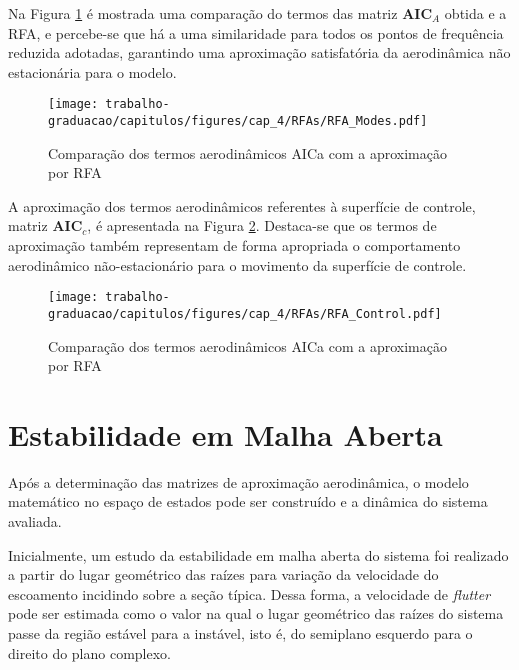 Na Figura \ref{fig:RFAsModes} é mostrada uma comparação do termos das matriz $\boldsymbol{AIC}_{A}$ obtida e a \gls{RFA}, e percebe-se que há a uma similaridade para todos os pontos de frequência reduzida adotadas, garantindo uma aproximação satisfatória da aerodinâmica não estacionária para o modelo.

\begin{figure}[!h]
    \centering
    \caption{Comparação dos termos aerodinâmicos \gls{AICa} com a aproximação por \gls{RFA}}
    \noindent\texttt{[image: trabalho-graduacao/capitulos/figures/cap\_4/RFAs/RFA\_Modes.pdf]}
    \label{fig:RFAsModes}
\end{figure}

\newpage

A aproximação dos termos aerodinâmicos referentes à superfície de controle, matriz $\boldsymbol{AIC}_{c}$, é apresentada na Figura \ref{fig:RFAsControl}. Destaca-se que os termos de aproximação também representam de forma apropriada o comportamento aerodinâmico não-estacionário para o movimento da superfície de controle.

\begin{figure}[ht!]
    \centering
    \caption{Comparação dos termos aerodinâmicos \gls{AICa} com a aproximação por \gls{RFA}}
    \noindent\texttt{[image: trabalho-graduacao/capitulos/figures/cap\_4/RFAs/RFA\_Control.pdf]}
    \label{fig:RFAsControl}
\end{figure}




\section{Estabilidade em Malha Aberta}\label{sec:malha-aberta}

Após a determinação das matrizes de aproximação aerodinâmica, o modelo matemático no espaço de estados pode ser construído e a dinâmica do sistema avaliada. 

Inicialmente, um estudo da estabilidade em malha aberta do sistema foi realizado a partir do lugar geométrico das raízes para variação da velocidade do escoamento incidindo sobre a seção típica. Dessa forma, a velocidade de \textit{flutter} pode ser estimada como o valor na qual o lugar geométrico das raízes do sistema passe da região estável para a instável, isto é, do semiplano esquerdo para o direito do plano complexo.

